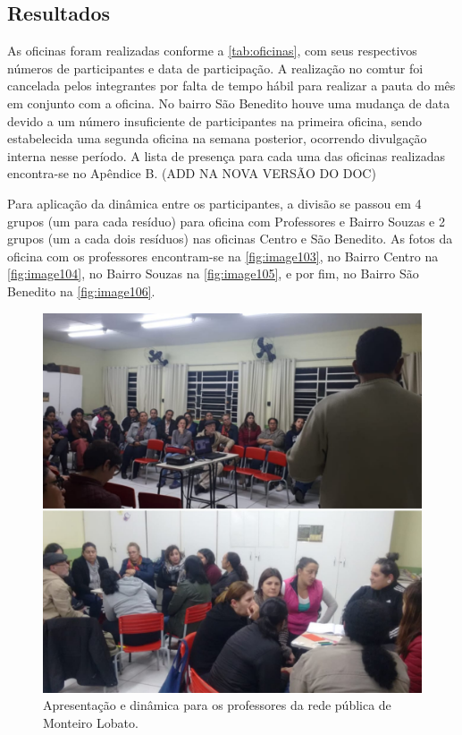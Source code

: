 \subsection{Resultados}
As oficinas foram realizadas conforme a \autoref{tab:oficinas}, com seus respectivos números de participantes e data de participação. A realização no \gls{comtur} foi cancelada pelos integrantes por falta de tempo hábil para realizar a pauta do mês em conjunto com a oficina. No bairro São Benedito houve uma mudança de data devido a um número insuficiente de participantes na primeira oficina, sendo estabelecida uma segunda oficina na semana posterior, ocorrendo divulgação interna nesse período. A lista de presença para cada uma das oficinas realizadas encontra-se no Apêndice B. (ADD NA NOVA VERSÃO DO DOC)

	

Para aplicação da dinâmica entre os participantes, a divisão se passou em 4 grupos (um para cada resíduo) para oficina com Professores e Bairro Souzas e 2 grupos (um a cada dois resíduos) nas oficinas Centro e São Benedito. As fotos da oficina com os professores encontram-se na \autoref{fig:image103}, no Bairro Centro na \autoref{fig:image104}, no Bairro Souzas na \autoref{fig:image105}, e por fim, no Bairro São Benedito na \autoref{fig:image106}.

\begin{figure}
	\centering
	\includegraphics[width=0.75\linewidth]{produtos/prodtres/image103}
	\caption{Apresentação e dinâmica para os professores da rede pública de Monteiro Lobato.}
	\label{fig:image103}
\end{figure}

